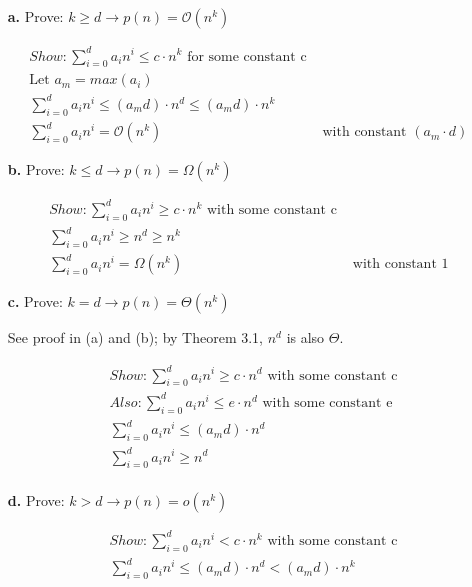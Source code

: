 \documentclass{article}
\begin{document}
\begin{enumerate}
\begin{enumerate}
	\item[\textbf{a.}] Prove: $ k \geq d \rightarrow p(n) = \mathcal{O}(n^k) $

	\begin{align*}
	& Show: \sum_{i=0}^d a_i n^i \leq c \cdot n^k \text{    for some constant c} \\
	& \text{Let $a_m = max(a_i)$ } \\
	& \sum_{i=0}^d a_i n^i \leq (a_m d) \cdot n^d \leq (a_m d) \cdot n^k \\
	& \sum_{i=0}^d a_i n^i = \mathcal{O}(n^k) & \text{    with constant $(a_m \cdot d)$ }
	\end{align*}

	\item[\textbf{b.}] Prove: $ k \leq d \rightarrow p(n) = \Omega(n^k) $

	\begin{align*}
		& Show: \sum_{i=0}^d a_i n^i \geq c \cdot n^k \text{    with some constant c} \\
		& \sum_{i=0}^d a_i n^i \geq n^d \geq n^k \\
		& \sum_{i=0}^d a_i n^i = \Omega(n^k) & \text{    with constant $1$ }
	\end{align*}

	\item[\textbf{c.}] Prove: $ k = d \rightarrow p(n) = \Theta(n^k) $

  See proof in (a) and (b); by Theorem 3.1, $n^d$ is also $\Theta$.

	\begin{align*}
		& Show: \sum_{i=0}^d a_i n^i \geq c \cdot n^d \text{    with some constant c} \\
		& Also: \sum_{i=0}^d a_i n^i \leq e \cdot n^d \text{    with some constant e} \\
		& \sum_{i=0}^d a_i n^i \leq (a_m d) \cdot n^d  \\
		& \sum_{i=0}^d a_i n^i \geq n^d \\
	\end{align*}

	\item[\textbf{d.}] Prove: $ k > d \rightarrow p(n) = o(n^k) $

	\begin{align*}
		& Show: \sum_{i=0}^d a_i n^i < c \cdot n^k \text{    with some constant c} \\
		& \sum_{i=0}^d a_i n^i \leq (a_m d) \cdot n^d < (a_m d) \cdot n^k \\
	\end{align*}


\end{enumerate}
\end{enumerate}
\end{document}
